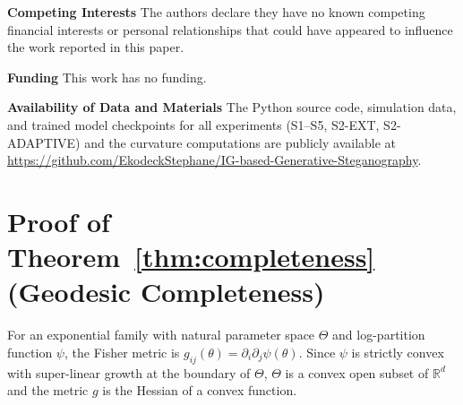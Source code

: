 \documentclass[a4paper,fleqn]{cas-dc}
\newcommand{\R}{\mathbb{R}}
\begin{document}
\noindent
\begin{sloppypar}
\textbf{Competing Interests} The authors declare they have no known
competing financial interests or personal relationships that could have
appeared to influence the work reported in this paper.
\end{sloppypar}


\noindent
\begin{sloppypar}
\textbf{Funding} This work has no funding.
\end{sloppypar}

\noindent
\begin{sloppypar}
\textbf{Availability of Data and Materials} The Python source code,
simulation data, and trained model checkpoints for all experiments
(S1--S5, S2-EXT, S2-ADAPTIVE) and the curvature computations are publicly
available at
\url{https://github.com/EkodeckStephane/IG-based-Generative-Steganography}.
\end{sloppypar}


%



\appendix

\section{Proof of Theorem~\ref{thm:completeness} (Geodesic Completeness)}
\label{app:completeness}

For an exponential family with natural parameter space $\Theta$ and
log-partition function $\psi$, the Fisher metric is
$g_{ij}(\theta) = \partial_i\partial_j\psi(\theta)$.  Since $\psi$ is
strictly convex with super-linear growth at the boundary of $\Theta$,
$\Theta$ is a convex open subset of $\R^d$ and the metric $g$ is the
Hessian of a convex function.
\end{document}
